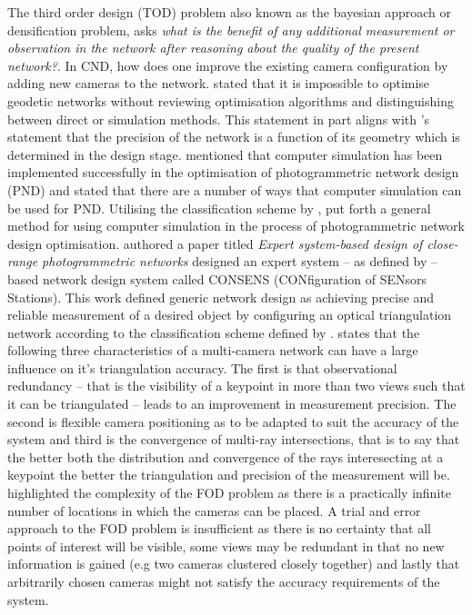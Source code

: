 The third order design (TOD) problem also known as the bayesian approach or densification problem, asks \textit{what is the benefit of any additional measurement or observation in the network after reasoning about the quality of the present network?}. In CND, how does one improve the existing camera configuration by adding new cameras to the network.
\citet{grafarend1974optimization} stated that it is impossible to optimise geodetic networks without reviewing optimisation algorithms and distinguishing between direct or simulation methods. This statement in part aligns with \citet{fraser1984network}'s statement that the precision of the network is a function of its geometry which is determined in the design stage. 
\citet{fraser1984network} mentioned that computer simulation has been implemented successfully in the optimisation of photogrammetric network design (PND) and stated that there are a number of ways that computer simulation can be used for PND. Utilising the classification scheme by \citet{grafarend1974optimization}, \citet{fraser1984network} put forth a general method for using computer simulation in the process of photogrammetric network design optimisation.
\citet{mason1995expert} authored a paper titled \textit{Expert system-based design of close-range photogrammetric networks} designed an expert system -- as defined by \citet{denning1986towards} -- based network design system called CONSENS (CONfiguration of SENsors Stations). This work defined generic network design as achieving precise and reliable measurement of a desired object by configuring an optical triangulation network according to the classification scheme defined by \citet{grafarend1974optimization}. \citet{mason1995expert} states that the following three characteristics of a multi-camera network can have a large influence on it's triangulation accuracy.
The first is that observational redundancy -- that is the visibility of a keypoint in more than two views such that it can be triangulated -- leads to an improvement in measurement precision. 
The second is flexible camera positioning as to be adapted to suit the accuracy of the system and third is the convergence of multi-ray intersections, that is to say that the better both the distribution and convergence of the rays interesecting at a keypoint the better the triangulation and precision of the measurement will be. 
\citet{mason1995expert} highlighted the complexity of the FOD problem as there is a practically infinite number of locations in which the cameras can be placed. A trial and error approach to the FOD problem is insufficient as there is no certainty that all points of interest will be visible, some views may be redundant in that no new information is gained (e.g two cameras clustered closely together) and lastly that arbitrarily chosen cameras might not satisfy the accuracy requirements of the system.

